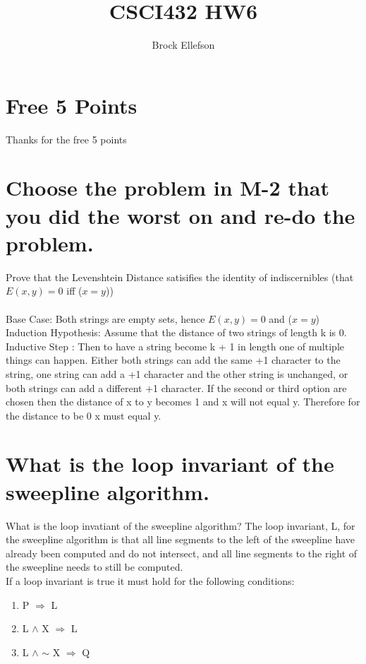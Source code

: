 \documentclass[10pt,a4paper]{article}
\author{Brock Ellefson}
\title{CSCI432 HW6}
\begin{document}
\maketitle
\section{Free 5 Points}
Thanks for the free 5 points
\section{Choose the problem in M-2 that you did the worst on and re-do the problem.}
Prove that the Levenshtein Distance satisifies the identity of indiscernibles (that $E(x,y) = 0$ iff ($x=y$))\\
\\
Base Case: Both strings are empty sets, hence $E(x,y) = 0$ and ($x=y$)\\
Induction Hypothesis: Assume that the distance of two strings of length k is 0.\\
Inductive Step : Then to have a string become k + 1 in length one of multiple things can happen. Either both strings can add the same +1 character to the string, one string can add a +1 character and the other string is unchanged, or both strings can add a different +1 character. If the second or third option are chosen then the distance of x to y becomes 1 and x will not equal y. Therefore for the distance to be 0 x must equal y.\\

\section{What is the loop invariant of the sweepline algorithm.}

What is the loop invatiant of the sweepline algorithm?
The loop invariant, L, for the sweepline algorithm is that all line segments to the left of the sweepline have already been computed and do not intersect, and all line segments to the right of the sweepline needs to still be computed.\\
If a loop invariant is true it must hold for the following conditions:
\begin{enumerate}
  \item P $\Rightarrow$ L 
  \item L $\wedge$ X $\Rightarrow$ L
  \item L $\wedge$ $\sim$ X $\Rightarrow$ Q
\end{enumerate}
\end{document}
